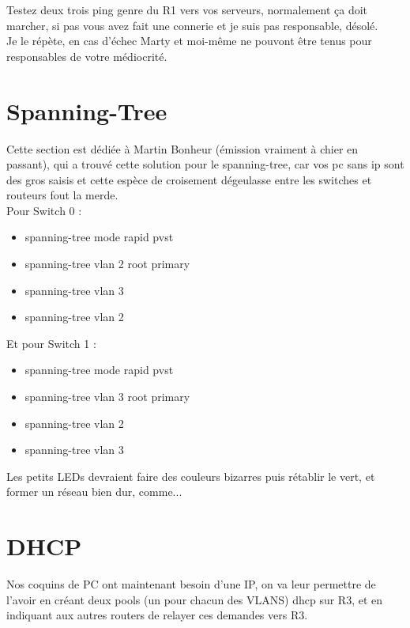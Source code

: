 \documentclass[a4paper,10pt,final,fleqn]{article}
\begin{document}
	Testez deux trois ping genre du R1 vers vos serveurs, normalement ça doit marcher, si pas vous avez fait une connerie et je suis pas responsable, désolé.\\

	Je le répète, en cas d'échec Marty et moi-même ne pouvont être tenus pour responsables de votre médiocrité.\\


\section{Spanning-Tree}
	
	Cette section est dédiée à Martin Bonheur (émission vraiment à chier en passant), qui a trouvé cette solution pour le spanning-tree, car vos pc sans ip sont des gros saisis et cette espèce de croisement dégeulasse entre les switches et routeurs fout la merde.\\

	Pour Switch 0 : \\

	\begin{itemize}
	 	\item spanning-tree mode rapid pvst
	 	\item spanning-tree vlan 2 root primary
	 	\item spanning-tree vlan 3
	 	\item spanning-tree vlan 2\\
	 \end{itemize} 

	Et pour Switch 1 : \\

	\begin{itemize}
		\item spanning-tree mode rapid pvst
		\item spanning-tree vlan 3 root primary
		\item spanning-tree vlan 2
		\item spanning-tree vlan 3
	\end{itemize}

	Les petits LEDs devraient faire des couleurs bizarres puis rétablir le vert, et former un réseau bien dur, comme...\\


\section{DHCP}

	Nos coquins de PC ont maintenant besoin d'une IP, on va leur permettre de l'avoir en créant deux pools (un pour chacun des VLANS) dhcp sur R3, et en indiquant aux autres routers de relayer ces demandes vers R3.\\
\end{document}
